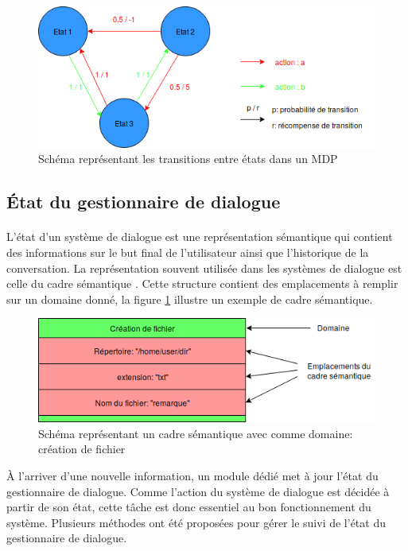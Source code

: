 	\begin{figure}[H]
		\centering
		\includegraphics[width=.95\linewidth]{images/DM/MDP.png} 
		\caption{Schéma représentant les transitions entre états dans un MDP} 
	\end{figure}
	
	
	\subsection{État du gestionnaire de dialogue}\label{trame}
		\paragraph{}
		L’état d’un système de dialogue est une représentation sémantique qui contient des informations sur le but final de l’utilisateur ainsi que l’historique de la conversation. La représentation souvent utilisée dans les systèmes de dialogue est celle du cadre sémantique \cite{Chen2017}. Cette structure contient des emplacements à remplir sur un domaine donné, la figure \ref{SFrame} illustre un exemple de cadre sémantique.\newline
		
		\begin{figure}[H]
			\centering
			\includegraphics[width=.7\linewidth]{images/DM/SFrame.png} 
			\caption{Schéma représentant un cadre sémantique avec comme domaine: création de fichier} 
			\label{SFrame}
		\end{figure}


À l’arriver d’une nouvelle information, un module dédié met à jour l’état du gestionnaire de dialogue. Comme l’action du système de dialogue est décidée à partir de son état, cette tâche est donc essentiel au bon fonctionnement du système. Plusieurs méthodes ont été proposées pour gérer le suivi de l’état du gestionnaire de dialogue.
